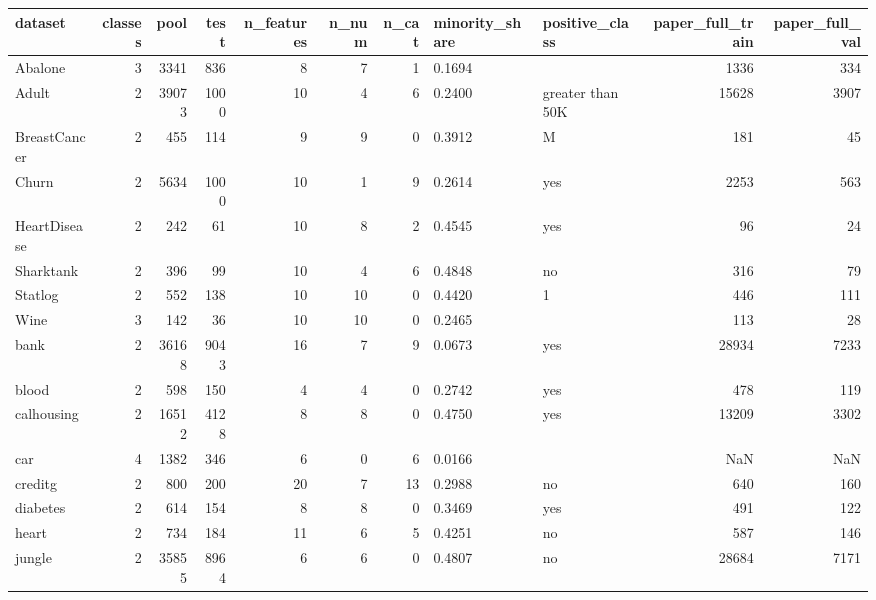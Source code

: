 \begin{tabular}{lrrrrrrllrr}
\toprule
dataset & classes & pool & test & n\_features & n\_num & n\_cat & minority\_share & positive\_class & paper\_full\_train & paper\_full\_val \\
\midrule
Abalone & 3 & 3341 & 836 & 8 & 7 & 1 & 0.1694 &  & 1336 & 334 \\
Adult & 2 & 39073 & 1000 & 10 & 4 & 6 & 0.2400 & greater than 50K & 15628 & 3907 \\
BreastCancer & 2 & 455 & 114 & 9 & 9 & 0 & 0.3912 & M & 181 & 45 \\
Churn & 2 & 5634 & 1000 & 10 & 1 & 9 & 0.2614 & yes & 2253 & 563 \\
HeartDisease & 2 & 242 & 61 & 10 & 8 & 2 & 0.4545 & yes & 96 & 24 \\
Sharktank & 2 & 396 & 99 & 10 & 4 & 6 & 0.4848 & no & 316 & 79 \\
Statlog & 2 & 552 & 138 & 10 & 10 & 0 & 0.4420 & 1 & 446 & 111 \\
Wine & 3 & 142 & 36 & 10 & 10 & 0 & 0.2465 &  & 113 & 28 \\
bank & 2 & 36168 & 9043 & 16 & 7 & 9 & 0.0673 & yes & 28934 & 7233 \\
blood & 2 & 598 & 150 & 4 & 4 & 0 & 0.2742 & yes & 478 & 119 \\
calhousing & 2 & 16512 & 4128 & 8 & 8 & 0 & 0.4750 & yes & 13209 & 3302 \\
car & 4 & 1382 & 346 & 6 & 0 & 6 & 0.0166 &  & NaN & NaN \\
creditg & 2 & 800 & 200 & 20 & 7 & 13 & 0.2988 & no & 640 & 160 \\
diabetes & 2 & 614 & 154 & 8 & 8 & 0 & 0.3469 & yes & 491 & 122 \\
heart & 2 & 734 & 184 & 11 & 6 & 5 & 0.4251 & no & 587 & 146 \\
jungle & 2 & 35855 & 8964 & 6 & 6 & 0 & 0.4807 & no & 28684 & 7171 \\
\bottomrule
\end{tabular}
